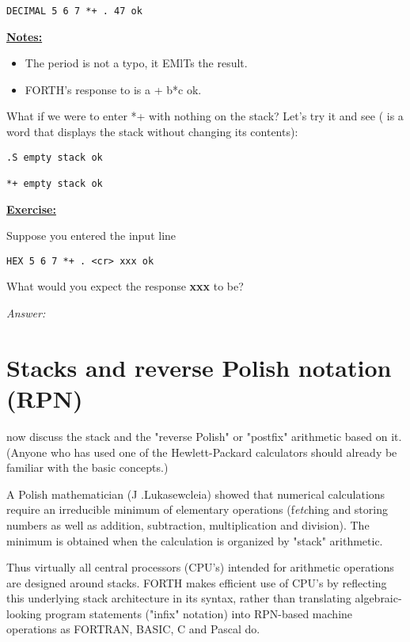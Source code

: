 \begin{lstlisting}
DECIMAL 5 6 7 *+ . 47 ok
\end{lstlisting}

\underline{\textbf{Notes:}}
\begin{itemize}
    \item The period  is not a typo, it EMlTs the result.
    \item FORTH’s response to  is a + b*c ok.
\end{itemize}

What if we were to enter *+ with nothing on the stack? Let's try it and see ( is a word that displays the stack without changing its contents):

\begin{lstlisting}
.S empty stack ok

*+ empty stack ok
\end{lstlisting}


\underline{\textbf{Exercise:}}

Suppose you entered the input line

\begin{lstlisting}
HEX 5 6 7 *+ . <cr> xxx ok
\end{lstlisting}

What would you expect the response \textbf{xxx} to be?

\textit{Answer:} 


\section{Stacks and reverse Polish notation (RPN)}

 now discuss the stack and the "reverse Polish" or "postfix" arithmetic based on it. (Anyone who has used one of the Hewlett-Packard calculators should already be familiar with the basic concepts.)

A Polish mathematician (J .Lukasewcleia) showed that numerical calculations require an irreducible minimum of elementary operations (f\textit{etc}hing and storing numbers as well as addition, subtraction, multiplication and division). The minimum is obtained when the calculation is organized by "stack" arithmetic.

Thus virtually all central processors (CPU’s) intended for arithmetic operations are designed around stacks. FORTH makes efficient use of CPU's by reflecting this underlying stack architecture in its syntax, rather than translating algebraic-looking program statements ("infix" notation) into RPN-based machine operations as FORTRAN, BASIC, C and Pascal do.

